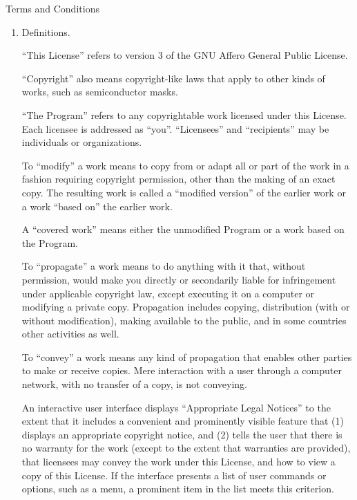 \documentclass[a4paper,twocolumn]{article}
\begin{document}
\begin{center}
{\Large \sc Terms and Conditions}
\end{center}


\begin{enumerate}

\addtocounter{enumi}{-1}

\item Definitions.

``This License'' refers to version 3 of the GNU Affero General Public License.

``Copyright'' also means copyright-like laws that apply to other kinds of
works, such as semiconductor masks.

``The Program'' refers to any copyrightable work licensed under this
License.  Each licensee is addressed as ``you''.  ``Licensees'' and
``recipients'' may be individuals or organizations.

To ``modify'' a work means to copy from or adapt all or part of the work
in a fashion requiring copyright permission, other than the making of an
exact copy.  The resulting work is called a ``modified version'' of the
earlier work or a work ``based on'' the earlier work.

A ``covered work'' means either the unmodified Program or a work based
on the Program.

To ``propagate'' a work means to do anything with it that, without
permission, would make you directly or secondarily liable for
infringement under applicable copyright law, except executing it on a
computer or modifying a private copy.  Propagation includes copying,
distribution (with or without modification), making available to the
public, and in some countries other activities as well.

To ``convey'' a work means any kind of propagation that enables other
parties to make or receive copies.  Mere interaction with a user through
a computer network, with no transfer of a copy, is not conveying.

An interactive user interface displays ``Appropriate Legal Notices''
to the extent that it includes a convenient and prominently visible
feature that (1) displays an appropriate copyright notice, and (2)
tells the user that there is no warranty for the work (except to the
extent that warranties are provided), that licensees may convey the
work under this License, and how to view a copy of this License.  If
the interface presents a list of user commands or options, such as a
menu, a prominent item in the list meets this criterion.


\end{enumerate}
\end{document}
